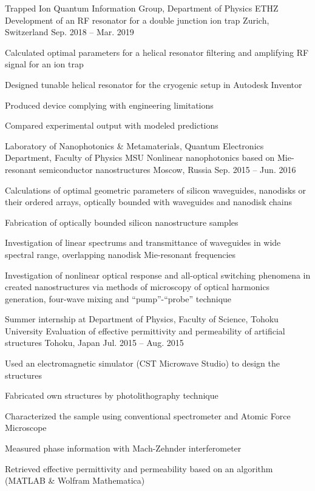 \begin{cventries}
	\cventry
		{Trapped Ion Quantum Information Group, Department of Physics ETHZ}
		{Development of an RF resonator for a double junction ion trap}
		{Zurich, Switzerland}
		{Sep. 2018 -- Mar. 2019}
		{
			\begin{cvitems}
				\item {Calculated optimal parameters for a helical resonator filtering and amplifying RF signal for an ion trap}
				\item {Designed tunable helical resonator for the cryogenic setup in Autodesk Inventor}
				\item {Produced device complying with engineering limitations}
				\item {Compared experimental output with modeled predictions}
			\end{cvitems}
		}

	\cventry
		{Laboratory of Nanophotonics \& Metamaterials, Quantum Electronics Department, Faculty of Physics MSU}
		{Nonlinear nanophotonics based on Mie-resonant semiconductor nanostructures}
		{Moscow, Russia}
		{Sep. 2015 -- Jun. 2016}
		{
			\begin{cvitems}
				\item {Calculations of optimal geometric parameters of silicon waveguides, nanodisks or their ordered arrays, optically bounded with waveguides and nanodisk chains }
				\item {Fabrication of optically bounded silicon nanostructure samples}
				\item {Investigation of linear spectrums and transmittance of waveguides in wide spectral range, overlapping nanodisk Mie-resonant frequencies }
				\item {Investigation of nonlinear optical response and all-optical switching phenomena in created nanostructures via methods of microscopy of optical harmonics generation, four-wave mixing and ``pump''-``probe'' technique}
			\end{cvitems}
		}

	\cventry
		{Summer internship at Department of Physics, Faculty of Science, Tohoku University}
		{Evaluation of effective permittivity and permeability of artificial structures}
		{Tohoku, Japan}
		{Jul. 2015 -- Aug. 2015}
		{
			\begin{cvitems}
				\item {Used an electromagnetic simulator (CST Microwave Studio) to design the structures}
				\item {Fabricated own structures by photolithography technique}
				\item {Characterized the sample using conventional spectrometer and Atomic Force Microscope}
				\item {Measured phase information with Mach-Zehnder interferometer}
				\item {Retrieved effective permittivity and permeability based on an algorithm (MATLAB \& Wolfram Mathematica)}
			\end{cvitems}
		}
	

\end{cventries}
